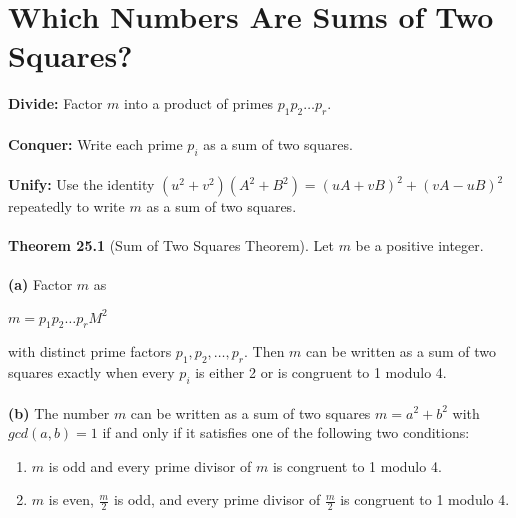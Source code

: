 \documentclass{article}
\begin{document}
\section{Which Numbers Are Sums of Two Squares?}
\textbf{Divide:} Factor $m$ into a product of primes $p_1p_2\ldots p_r$.\\\\
\textbf{Conquer:} Write each prime $p_i$ as a sum of two squares.\\\\
\textbf{Unify:} Use the identity $(u^2+v^2)(A^2+B^2)=(uA+vB)^2+(vA-uB)^2$ repeatedly to write $m$ as a sum of two squares.\\\\
\textbf{Theorem 25.1} (Sum of Two Squares Theorem). Let $m$ be a positive integer.\\\\
\textbf{(a)} Factor $m$ as
\begin{center}
$m = p_1p_2\ldots p_rM^2$
\end{center}
with distinct prime factors $p_1, p_2, \ldots, p_r$. Then $m$ can be written as a sum of two squares exactly when every $p_i$ is either 2 or is congruent to 1 modulo 4.\\\\
\textbf{(b)} The number $m$ can be written as a sum of two squares $m=a^2 +b^2$ with $gcd(a,b)=1$ if and only if it satisfies one of the following two conditions:
\begin{enumerate}
\item $m$ is odd and every prime divisor of $m$ is congruent to 1 modulo 4.
\item $m$ is even, $\frac{m}{2}$ is odd, and every prime divisor of $\frac{m}{2}$ is congruent to 1 modulo 4.
\end{enumerate}
\end{document}
